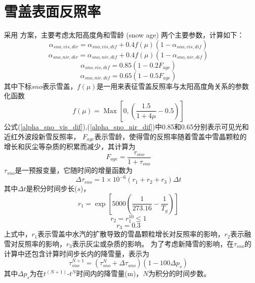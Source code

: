 \section{雪盖表面反照率}
采用 \citet{dickinson1986biosphere} 方案，主要考虑太阳高度角和雪龄 (snow age) 两个主要参数，计算如下：
\begin{equation}
\alpha_{sno, vis, dir}=\alpha_{sno, vis, dif}+0.4 f(\mu)\left(1-\alpha_{sno, vis, dif}\right)
\end{equation}
\begin{equation}
\alpha_{sno,nir,dir}=\alpha_{sno, nir, dif}+0.4 f(\mu)\left(1-\alpha_{sno,nir,dif}\right)
\end{equation}   
\begin{equation}\label{alpha_sno_vis_dif}
\alpha_{sno,vis,dif}=0.85\left(1-0.2 F_{age}\right)
\end{equation}\label{eq:soil_albedo6}
\begin{equation}\label{alpha_sno_nir_dif}
\alpha_{sno,nir,dif}=0.65\left(1-0.5 F_{age}\right)
\end{equation}
其中下标$sno$表示雪盖，$f(\mu)$是一用来表征雪盖反照率与太阳高度角关系的参数化函数
\begin{equation}\label{fmu}
f(\mu)=\operatorname{Max}\left[0,\left(\frac{1.5}{1+4 \mu}-0.5\right)\right]
\end{equation}
公式(\ref{alpha_sno_vis_dif}),(\ref{alpha_sno_nir_dif})中0.85和0.65分别表示可见光和近红外波段新雪反照率，
$F_{age}$表示雪龄，使得雪的反照率随着雪盖中雪晶颗粒的增长和灰尘等杂质的积累而减少，其计算为
\begin{equation}
F_{a g e}=\frac{\tau_{sno}}{1+\tau_{sno}}
\end{equation}
$\tau_{sno}$是一预报变量，它随时间的增量函数为
\begin{equation}
\Delta \tau_{sno}=1 \times 10^{-6}\left(r_{1}+r_{2}+r_{3}\right) \Delta t
\end{equation}
其中$\Delta t$是积分时间步长($s$)，
\begin{equation}
r_{1}=\exp \left[5000\left(\frac{1}{273.16}-\frac{1}{T_{g}}\right)\right]
\end{equation}
\begin{equation}
r_{2}=r_{1}^{10} \leq 1
\end{equation}
\begin{equation}
r_{3}=0.3
\end{equation}
上式中，$r_1$表示雪盖中水汽的扩散导致的雪晶颗粒增长对反照率的影响，$r_2$表示融雪对反照率的影响，$r_3$表示灰尘或杂质的影响。
为了考虑新降雪的影响，在$\tau_{sno}$的计算中还包含计算时间步长内的降雪量，表示为
\begin{equation}
\tau_{sno}^{N+1}=\left(\tau_{sno}^{N}+\Delta \tau_{sno}\right)\left(1-100 \Delta p_{s}\right)
\end{equation}
其中$\Delta p_{s}$为在$t^(N+1)$-$t^N$时间内的降雪量(m)，$N$为积分的时间步数。


